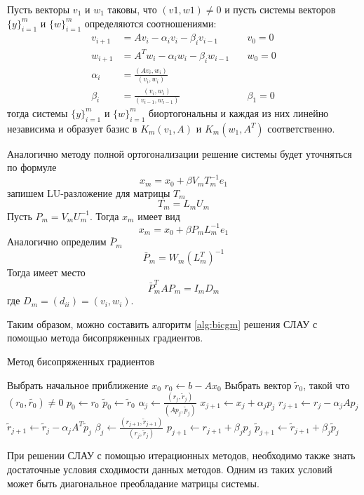 \documentclass[a4paper, fontsize=14pt]{article}
\begin{document}
    Пусть векторы $v_1$ и $w_1$ таковы, что $(v1 , w1) \neq 0$ и пусть системы векторов $\{y\}^m_{i=1}$
и $\{w\}^m_{i=1}$ определяются соотношениями:
\begin{align*}
    v_{i+1} &= A v_i - \alpha_i v_i - \beta_i v_{i-1} \quad &v_0 = 0\\
    w_{i+1} &= A^T w_i - \alpha_i w_i - \beta_i w_{i-1} \quad &w_0 = 0\\
    \alpha_i &= \frac{(Av_i,w_i)}{(v_i,w_i)} \\ 
    \beta_i &= \frac{(v_i,w_i)}{(v_{i-1},w_{i-1})} \quad &\beta_1 = 0
\end{align*}
тогда системы $\{y\}^m_{i=1}$ и $\{w\}^m_{i=1}$ биортогональны и каждая из них линейно независима и
образует базис в $K_m(v_1,A)$ и $K_m(w_1,A^T)$ соответственно.

Аналогично методу полной ортогонализации решение системы будет уточняться по формуле
$$ x_m = x_0 +\beta V_m T_m^{-1} e_1 $$
запишем LU-разложение для матрицы $T_m$
$$ T_m =  L_m U_m $$
Пусть $P_m = V_m U_m^{-1}$. Тогда $x_m$ имеет вид
$$ x_m = x_0 + \beta P_m L_m^{-1} e_1 $$
Аналогично определим $\bar{P}_m$
$$ \bar{P}_m = W_m (L_m^T)^{-1} $$
Тогда имеет место
$$ \bar{P}_m^T A P_m = I_m  D_m $$ 
где $D_m = (d_{ii}) = (v_i,w_i)$.

Таким образом, можно составить алгоритм \ref{alg:bicgm} решения СЛАУ с помощью метода бисопряженных
градиентов. \cite{saad}
\begin{algorithm}
    \caption{Метод бисопряженных градиентов}\label{alg:bicgm}
\begin{algorithmic}
    \State Выбрать начальное приближение $x_0$
    \State $r_0 \gets b - Ax_0$
    \State Выбрать вектор $\tilde{r}_0$, такой что $(r_0,\tilde{r_0}) \neq 0$
    \State $p_0 \gets r_0$
    \State $\tilde{p}_0 \gets \tilde{r}_0$
        \State $\alpha_j \gets \frac{(r_j,\tilde{r}_j)}{(Ap_j,\tilde{p}_j)}$
        \State $x_{j+1} \gets x_{j} + \alpha_j p_j$
        \State $r_{j+1} \gets r_j - \alpha_j A p_j$
        \State $\tilde{r}_{j+1} \gets \tilde{r}_j - \alpha_j A^T \tilde{p}_j$
        \State $\beta_j \gets \frac{(r_{j+1},\tilde{r}_{j+1})}{(r_j,\tilde{r}_j)}$
        \State $ p_{j+1} \gets r_{j+1}+\beta_j p_j$
        \State $ \tilde{p}_{j+1} \gets \tilde{r}_{j+1}+\beta_j \tilde{p}_j$
    \EndFor

\end{algorithmic}
\end{algorithm}
    
    При решении СЛАУ с помощью итерационных методов, необходимо также знать достаточные условия
сходимости данных методов. Одним из таких условий может быть диагональное преобладание матрицы
системы.  
\end{document}
